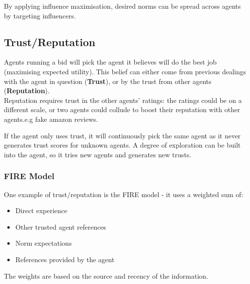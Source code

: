 By applying influence maximisation, desired norms can be spread across agents by targeting influencers.


\subsection{Trust/Reputation}
Agents running a bid will pick the agent it believes will do the best job (maximising expected utility). This belief can either come from previous dealings with the agent in question (\textbf{Trust}), or by the trust from other agents (\textbf{Reputation}). \\

Reputation requires trust in the other agents' ratings: the ratings could be on a different scale, or two agents could collude to boost their reputation with other agents.e.g fake amazon reviews. 

If the agent only uses trust, it will continuously pick the same agent as it never generates trust scores for unknown agents. A degree of exploration can be built into the agent, so it tries new agents and generates new trusts.

\subsubsection{FIRE Model}
One example of trust/reputation is the FIRE model - it uses a weighted sum of:
\begin{itemize}
    \item Direct experience
    \item Other trusted agent references
    \item Norm expectations
    \item References provided by the agent
\end{itemize}
The weights are based on the source and recency of the information. 

